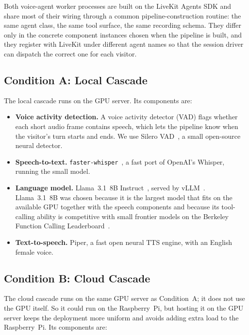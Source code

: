 Both voice-agent worker processes are built on the LiveKit Agents SDK and share most of their wiring through a common pipeline-construction routine: the same agent class, the same tool surface, the same recording schema.
They differ only in the concrete component instances chosen when the pipeline is built, and they register with LiveKit under different agent names so that the session driver can dispatch the correct one for each visitor.

\subsection{Condition A: Local Cascade}
\label{sec:local_mode}

The local cascade runs on the GPU server.
Its components are:

\begin{itemize}
    \item \textbf{Voice activity detection.} A voice activity detector (VAD) flags whether each short audio frame contains speech, which lets the pipeline know when the visitor's turn starts and ends. We use Silero VAD~\cite{silero_vad}, a small open-source neural detector.
    \item \textbf{Speech-to-text.} \texttt{faster-whisper}~\cite{radford2023whisper}, a fast port of OpenAI's Whisper, running the small model.
    \item \textbf{Language model.} Llama~3.1~8B Instruct~\cite{grattafiori2024llama3}, served by vLLM~\cite{kwon2023vllm}. Llama~3.1~8B was chosen because it is the largest model that fits on the available GPU together with the speech components and because its tool-calling ability is competitive with small frontier models on the Berkeley Function Calling Leaderboard~\cite{patil2025bfcl}.
    \item \textbf{Text-to-speech.} Piper, a fast open neural TTS engine, with an English female voice.
\end{itemize}

\subsection{Condition B: Cloud Cascade}
\label{sec:cloud_mode}

The cloud cascade runs on the same GPU server as Condition~A; it does not use the GPU itself. So it could run on the Raspberry~Pi, but hosting it on the GPU server keeps the deployment more uniform and avoids adding extra load to the Raspberry~Pi.
Its components are:

